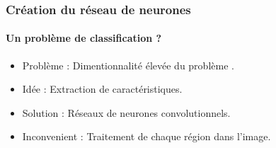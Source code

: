\begin{frame}
\frametitle{Création du réseau de neurones}
\framesubtitle{Un problème de classification ?}

\begin{itemize}
    \item<1->   Problème : Dimentionnalité élevée du problème .
    \item<2->   Idée : Extraction de caractéristiques.
    \item<3->   Solution : Réseaux de neurones convolutionnels.
    \item<4->   Inconvenient : Traitement de chaque région dans l'image.
\end{itemize}


\end{frame}
